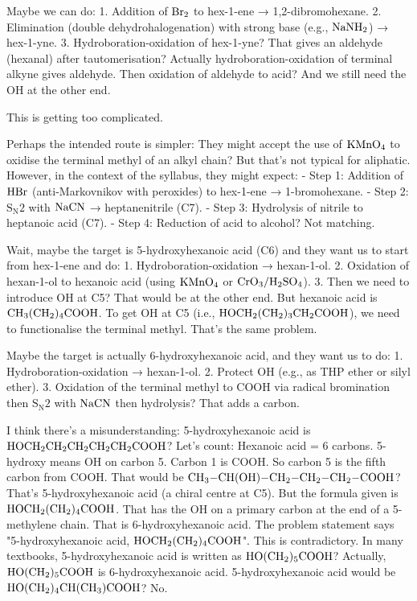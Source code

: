 \documentclass[11pt]{article}
\begin{document}
\begin{corrige}
Maybe we can do:
1. Addition of \(\ce{Br2}\) to hex-1-ene → 1,2-dibromohexane.
2. Elimination (double dehydrohalogenation) with strong base (e.g., \(\ce{NaNH2}\)) → hex-1-yne.
3. Hydroboration-oxidation of hex-1-yne? That gives an aldehyde (hexanal) after tautomerisation? Actually hydroboration-oxidation of terminal alkyne gives aldehyde. Then oxidation of aldehyde to acid? And we still need the OH at the other end.

This is getting too complicated.

Perhaps the intended route is simpler: They might accept the use of \(\ce{KMnO4}\) to oxidise the terminal methyl of an alkyl chain? But that's not typical for aliphatic. However, in the context of the syllabus, they might expect:
- Step 1: Addition of \(\ce{HBr}\) (anti-Markovnikov with peroxides) to hex-1-ene → 1-bromohexane.
- Step 2: \(\mathrm{S_N2}\) with \(\ce{NaCN}\) → heptanenitrile (C7).
- Step 3: Hydrolysis of nitrile to heptanoic acid (C7).
- Step 4: Reduction of acid to alcohol? Not matching.

Wait, maybe the target is 5-hydroxyhexanoic acid (C6) and they want us to start from hex-1-ene and do:
1. Hydroboration-oxidation → hexan-1-ol.
2. Oxidation of hexan-1-ol to hexanoic acid (using \(\ce{KMnO4}\) or \(\ce{CrO3}/\ce{H2SO4}\)).
3. Then we need to introduce OH at C5? That would be at the other end. But hexanoic acid is \(\ce{CH3(CH2)4COOH}\). To get OH at C5 (i.e., \(\ce{HOCH2(CH2)3CH2COOH}\)), we need to functionalise the terminal methyl. That's the same problem.

Maybe the target is actually 6-hydroxyhexanoic acid, and they want us to do:
1. Hydroboration-oxidation → hexan-1-ol.
2. Protect OH (e.g., as THP ether or silyl ether).
3. Oxidation of the terminal methyl to COOH via radical bromination then \(\mathrm{S_N2}\) with \(\ce{NaCN}\) then hydrolysis? That adds a carbon.

I think there's a misunderstanding: 5-hydroxyhexanoic acid is \(\ce{HOCH2CH2CH2CH2CH2COOH}\)? Let's count: Hexanoic acid = 6 carbons. 5-hydroxy means OH on carbon 5. Carbon 1 is COOH. So carbon 5 is the fifth carbon from COOH. That would be \(\ce{CH3-CH(OH)-CH2-CH2-CH2-COOH}\)? That's 5-hydroxyhexanoic acid (a chiral centre at C5). But the formula given is \(\ce{HOCH2(CH2)4COOH}\). That has the OH on a primary carbon at the end of a 5-methylene chain. That is 6-hydroxyhexanoic acid. The problem statement says "5-hydroxyhexanoic acid, \(\ce{HOCH2(CH2)4COOH}\)". This is contradictory. In many textbooks, 5-hydroxyhexanoic acid is written as \(\ce{HO(CH2)5COOH}\)? Actually, \(\ce{HO(CH2)5COOH}\) is 6-hydroxyhexanoic acid. 5-hydroxyhexanoic acid would be \(\ce{HO(CH2)4CH(CH3)COOH}\)? No.


\end{corrige}
\end{document}
